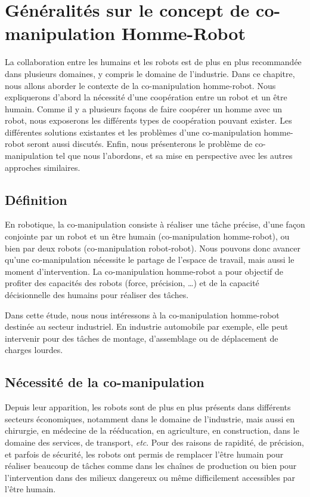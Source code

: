 \documentclass[12pt,a4paper,twoside]{report}
\begin{document}
\chapter{Généralités sur le concept de co-manipulation Homme-Robot \label{Chapitre_1}}
\minitoc

La collaboration entre les humains et les robots est de plus en plus recommandée dans plusieurs domaines, y compris le domaine de l'industrie. Dans ce chapitre, nous allons aborder le contexte de la co-manipulation homme-robot. Nous expliquerons d'abord la nécessité d'une coopération entre un robot et un être humain. Comme il y a plusieurs façons de faire coopérer un homme avec un robot, nous exposerons les différents types de coopération pouvant exister. Les différentes solutions existantes et les problèmes d'une co-manipulation homme-robot seront aussi discutés. Enfin, nous présenterons le problème de co-manipulation tel que nous l'abordons, et sa mise en perspective avec les autres approches similaires.

\section{Définition}
En robotique, la co-manipulation consiste à réaliser une tâche précise, d'une façon conjointe par un robot et un être humain (co-manipulation homme-robot), ou bien par deux robots (co-manipulation robot-robot). Nous pouvons donc avancer qu'une co-manipulation nécessite le partage de l'espace de travail, mais aussi le moment d'intervention. La co-manipulation homme-robot a pour objectif de profiter des capacités des robots (force, précision, \ldots) et de la capacité décisionnelle des humains pour réaliser des tâches.

Dans cette étude, nous nous intéressons à la co-manipulation homme-robot destinée au secteur industriel. En industrie automobile par exemple, elle peut intervenir pour des tâches de montage, d'assemblage ou  de déplacement de charges lourdes.


\section{Nécessité de la co-manipulation}
Depuis leur apparition, les robots sont de plus en plus présents dans différents secteurs économiques, notamment dans le domaine de l'industrie, mais aussi en chirurgie, en médecine de la rééducation, en agriculture, en construction, dans le domaine des services, de transport, \emph{etc}. Pour des raisons de rapidité, de précision, et parfois de sécurité, les robots ont permis de remplacer l'être humain pour réaliser beaucoup de tâches comme dans les chaînes de production ou bien pour l'intervention dans des milieux dangereux ou même difficilement accessibles par l'être humain.
\end{document}
